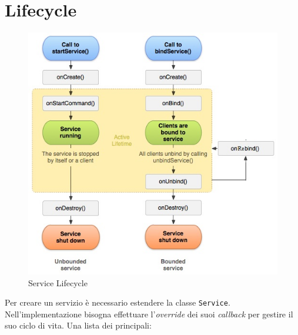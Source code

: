 \documentclass{book}
\begin{document}
\section{Lifecycle}
\begin{figure}
    \centering
    \includegraphics[scale = 0.6]{res/img/service_lifecycle.jpg}
    \caption{Service Lifecycle}
    \label{fig:my_label}
\end{figure}
Per creare un servizio è necessario estendere la classe \texttt{Service}. Nell'implementazione bisogna effettuare l'\textit{override} dei suoi \textit{callback} per gestire il suo ciclo di vita. Una lista dei principali:
\end{document}
